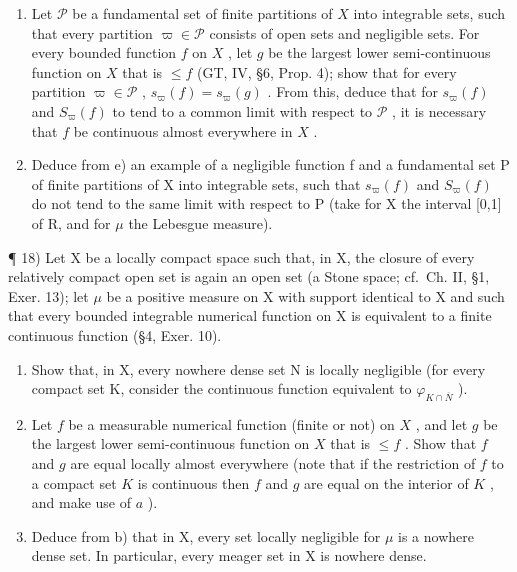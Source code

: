 \begin{enumerate}
\item
  Let \(\mathcal{P}\) be a fundamental set of finite partitions of \(X\) into integrable sets, such that every partition \(\varpi \in \mathcal{P}\) consists of open sets and negligible sets. For every bounded function \(f\) on \(X\) , let \(g\) be the largest lower semi-continuous function on \(X\) that is \(\leqslant f\) (GT, IV, §6, Prop. 4); show that for every partition \(\varpi \in \mathcal{P}\) , \(s_{\varpi}(f) = s_{\varpi}(g)\) . From this, deduce that for \(s_{\varpi}(f)\) and \(S_{\varpi}(f)\) to tend to a common limit with respect to \(\mathcal{P}\) , it is necessary that \(f\) be continuous almost everywhere in \(X\) .
\item
  Deduce from e) an example of a negligible function f and a fundamental set P of finite partitions of X into integrable sets, such that \(s_{\varpi}(f)\) and \(S_{\varpi}(f)\) do not tend to the same limit with respect to P (take for X the interval {[}0,1{]} of R, and for \(\mu\) the Lebesgue measure).
\end{enumerate}

¶ 18) Let X be a locally compact space such that, in X, the closure of every relatively compact open set is again an open set (a Stone space; cf.~Ch. II, §1, Exer. 13); let \(\mu\) be a positive measure on X with support identical to X and such that every bounded integrable numerical function on X is equivalent to a finite continuous function (§4, Exer. 10).

\begin{enumerate}
\def\labelenumi{\alph{enumi})}
\item
  Show that, in X, every nowhere dense set N is locally negligible (for every compact set K, consider the continuous function equivalent to \(\varphi_{K\cap \overline{N}}\) ).
\item
  Let \(f\) be a measurable numerical function (finite or not) on \(X\) , and let \(g\) be the largest lower semi-continuous function on \(X\) that is \(\leqslant f\) . Show that \(f\) and \(g\) are equal locally almost everywhere (note that if the restriction of \(f\) to a compact set \(K\) is continuous then \(f\) and \(g\) are equal on the interior of \(K\) , and make use of \(a\) ).
\item
  Deduce from b) that in X, every set locally negligible for \(\mu\) is a nowhere dense set. In particular, every meager set in X is nowhere dense.
\end{enumerate}

